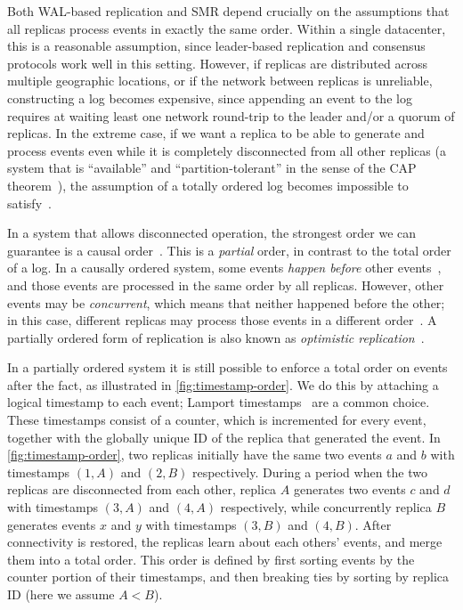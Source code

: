 \documentclass[sigconf]{acmart}
\begin{document}
Both WAL-based replication and SMR depend crucially on the assumptions that all replicas process events in exactly the same order.
Within a single datacenter, this is a reasonable assumption, since leader-based replication and consensus protocols work well in this setting.
However, if replicas are distributed across multiple geographic locations, or if the network between replicas is unreliable, constructing a log becomes expensive, since appending an event to the log requires at waiting least one network round-trip to the leader and/or a quorum of replicas.
In the extreme case, if we want a replica to be able to generate and process events even while it is completely disconnected from all other replicas (a system that is ``available'' and ``partition-tolerant'' in the sense of the CAP theorem~\cite{Gilbert:2002}), the assumption of a totally ordered log becomes impossible to satisfy~\cite{Chandra:1996,Davidson:1985}.

In a system that allows disconnected operation, the strongest order we can guarantee is a causal order~\cite{Attiya:2015}.
This is a \emph{partial} order, in contrast to the total order of a log.
In a causally ordered system, some events \emph{happen before} other events~\cite{Lamport:1978}, and those events are processed in the same order by all replicas.
However, other events may be \emph{concurrent}, which means that neither happened before the other; in this case, different replicas may process those events in a different order~\cite{Birman:1991}.
A partially ordered form of replication is also known as \emph{optimistic replication}~\cite{Saito:2005}.

In a partially ordered system it is still possible to enforce a total order on events after the fact, as illustrated in \autoref{fig:timestamp-order}.
We do this by attaching a logical timestamp to each event; Lamport timestamps~\cite{Lamport:1978} are a common choice.
These timestamps consist of a counter, which is incremented for every event, together with the globally unique ID of the replica that generated the event.
In \autoref{fig:timestamp-order}, two replicas initially have the same two events $a$ and $b$ with timestamps $(1,A)$ and $(2,B)$ respectively.
During a period when the two replicas are disconnected from each other, replica $A$ generates two events $c$ and $d$ with timestamps $(3,A)$ and $(4,A)$ respectively, while concurrently replica $B$ generates events $x$ and $y$ with timestamps $(3,B)$ and $(4,B)$.
After connectivity is restored, the replicas learn about each others' events, and merge them into a total order.
This order is defined by first sorting events by the counter portion of their timestamps, and then breaking ties by sorting by replica ID (here we assume $A<B$).
\end{document}
